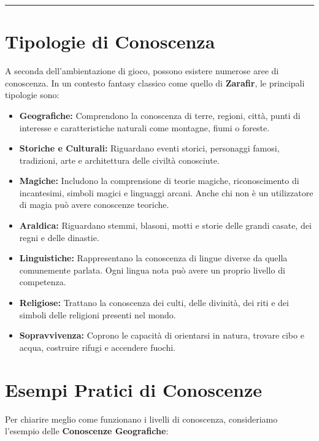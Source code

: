 \documentclass[../manuale_main.tex]{subfiles}
\begin{document}
\vspace{0.5cm}
\noindent
\begin{center}
\rule{\textwidth}{0.4pt} 
\end{center}
\vspace{0.5cm}

\section*{Tipologie di Conoscenza}
A seconda dell’ambientazione di gioco, possono esistere numerose aree di conoscenza. In un contesto fantasy classico come quello di \textbf{Zarafir}, le principali tipologie sono:

\begin{itemize}
    \item \textbf{Geografiche:} Comprendono la conoscenza di terre, regioni, città, punti di interesse e caratteristiche naturali come montagne, fiumi o foreste.
    
    \item \textbf{Storiche e Culturali:} Riguardano eventi storici, personaggi famosi, tradizioni, arte e architettura delle civiltà conosciute.
    
    \item \textbf{Magiche:} Includono la comprensione di teorie magiche, riconoscimento di incantesimi, simboli magici e linguaggi arcani. Anche chi non è un utilizzatore di magia può avere conoscenze teoriche.
    
    \item \textbf{Araldica:} Riguardano stemmi, blasoni, motti e storie delle grandi casate, dei regni e delle dinastie.
    
    \item \textbf{Linguistiche:} Rappresentano la conoscenza di lingue diverse da quella comunemente parlata. Ogni lingua nota può avere un proprio livello di competenza.
    
    \item \textbf{Religiose:} Trattano la conoscenza dei culti, delle divinità, dei riti e dei simboli delle religioni presenti nel mondo.
    
    \item \textbf{Sopravvivenza:} Coprono le capacità di orientarsi in natura, trovare cibo e acqua, costruire rifugi e accendere fuochi.
\end{itemize}

\vspace{0.3cm}

\section*{Esempi Pratici di Conoscenze}
Per chiarire meglio come funzionano i livelli di conoscenza, consideriamo l’esempio delle \textbf{Conoscenze Geografiche}:
\end{document}
